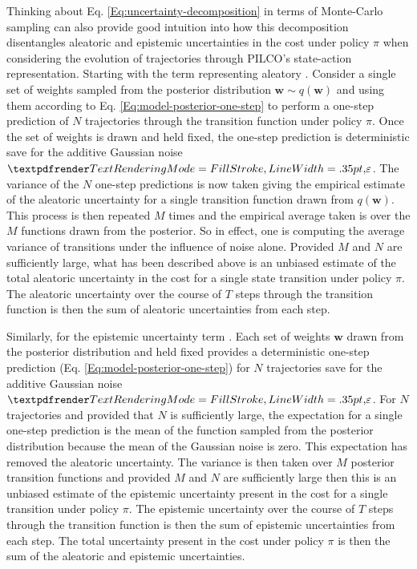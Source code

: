 Thinking about Eq. \ref{Eq:uncertainty-decomposition} in terms of Monte-Carlo sampling can also provide good intuition into how this decomposition disentangles aleatoric and epistemic uncertainties in the cost under policy $\pi$ when considering the evolution of trajectories through PILCO's state-action representation. Starting with the term representing aleatory . Consider a single set of weights sampled from the posterior distribution $\mathbf{w}\sim q(\mathbf{w})$ and using them according to Eq. \ref{Eq:model-posterior-one-step} to perform a one-step prediction of $N$ trajectories through the transition function under policy $\pi$. Once the set of weights is drawn and held fixed, the one-step prediction is deterministic save for the additive Gaussian noise $\boldgreek{\varepsilon}$. The variance of the $N$ one-step predictions is now taken giving the empirical estimate of the aleatoric uncertainty for a single transition function drawn from $q(\mathbf{w})$. This process is then repeated $M$ times and the empirical average taken is over the $M$ functions drawn from the posterior. So in effect, one is computing the average variance of transitions under the influence of noise alone. Provided $M$ and $N$ are sufficiently large, what has been described above is an unbiased estimate of the total aleatoric uncertainty in the cost for a single state transition under policy $\pi$. The aleatoric uncertainty over the course of $T$ steps through the transition function is then the sum of aleatoric uncertainties from each step.

Similarly, for the epistemic uncertainty term . Each set of weights $\mathbf{w}$ drawn from the posterior distribution and held fixed provides a deterministic one-step prediction (Eq. \ref{Eq:model-posterior-one-step}) for $N$ trajectories save for the additive Gaussian noise $\boldgreek{\varepsilon}$. For $N$ trajectories and provided that $N$ is sufficiently large, the expectation for a single one-step prediction is the mean of the function sampled from the posterior distribution because the mean of the Gaussian noise is zero. This expectation has removed the aleatoric uncertainty. The variance is then taken over $M$ posterior transition functions and provided $M$ and $N$ are sufficiently large then this is an unbiased estimate of the epistemic uncertainty present in the cost for a single transition under policy $\pi$. The epistemic uncertainty over the course of $T$ steps through the transition function is then the sum of epistemic uncertainties from each step. The total uncertainty present in the cost under policy $\pi$ is then the sum of the aleatoric and epistemic uncertainties.

